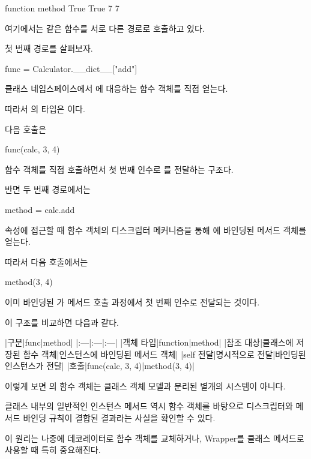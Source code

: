 \begin{dhkzsh}
function
method
True
True
7
7
\end{dhkzsh}

여기에서는 같은 함수를 서로 다른 경로로 호출하고 있다.

첫 번째 경로를 살펴보자.

\begin{dhkcode}
func = Calculator.__dict__["add"]
\end{dhkcode}

클래스 네임스페이스에서 에 대응하는 함수 객체를 직접 얻는다.

따라서 의 타입은 이다.

다음 호출은

\begin{dhkcode}
func(calc, 3, 4)
\end{dhkcode}

함수 객체를 직접 호출하면서 첫 번째 인수로 를 전달하는 구조다.

반면 두 번째 경로에서는

\begin{dhkcode}
method = calc.add
\end{dhkcode}

 속성에 접근할 때 함수 객체의 디스크립터 메커니즘을 통해 에 바인딩된 메서드 객체를 얻는다.

따라서 다음 호출에서는

\begin{dhkcode}
method(3, 4)
\end{dhkcode}

이미 바인딩된 가 메서드 호출 과정에서 첫 번째 인수로 전달되는 것이다.

이 구조를 비교하면 다음과 같다.

\begin{dhktable}
|구분|func|method|
|:---|:---|:---|
|객체 타입|function|method|
|참조 대상|클래스에 저장된 함수 객체|인스턴스에 바인딩된 메서드 객체|
|self 전달|명시적으로 전달|바인딩된 인스턴스가 전달|
|호출|func(calc, 3, 4)|method(3, 4)|
\end{dhktable}

이렇게 보면 의 함수 객체는 클래스 객체 모델과 분리된 별개의 시스템이 아니다.

클래스 내부의 일반적인 인스턴스 메서드 역시 함수 객체를 바탕으로 디스크립터와 메서드 바인딩 규칙이 결합된 결과라는 사실을 확인할 수 있다.

이 원리는 나중에 데코레이터로 함수 객체를 교체하거나, Wrapper를 클래스 메서드로 사용할 때 특히 중요해진다.

